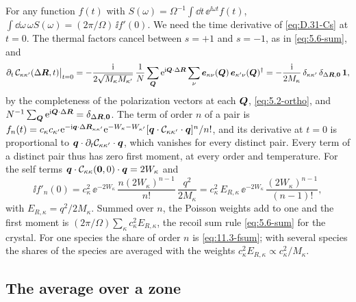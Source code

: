 For any function $f(t)$ with $S(\omega) = \Omega^{-1}\int\dd t\,\ee^{\ii\omega t}f(t)$, $\int\dd\omega\,\omega S(\omega) = (2\pi/\Omega)\,\ii f'(0)$. We need the time derivative of \cref{eq:D.31-Cs} at $t = 0$. The thermal factors cancel between $s = +1$ and $s = -1$, as in \cref{eq:5.6-sum}, and
\begin{equation*}
  \partial_t\,\mathcal{C}_{\kappa\kappa'}(\Delta\bm{R},t)\big|_{t=0} = -\frac{\mathrm{i}}{2\sqrt{M_\kappa M_{\kappa'}}}\,\frac1N\sum_{\bm{Q}}\mathrm{e}^{\mathrm{i}\bm{Q}\cdot\Delta\bm{R}}\sum_\nu\bm{e}_{\kappa\nu}(\bm{Q})\,\bm{e}_{\kappa'\nu}(\bm{Q})^\dagger = -\frac{\mathrm{i}}{2M_\kappa}\,\delta_{\kappa\kappa'}\,\delta_{\Delta\bm{R},\bm{0}}\,\mathbf{1} ,
\end{equation*}
by the completeness of the polarization vectors at each $\bm{Q}$, \cref{eq:5.2-ortho}, and $N^{-1}\sum_{\bm{Q}}\mathrm{e}^{\mathrm{i}\bm{Q}\cdot\Delta\bm{R}} = \delta_{\Delta\bm{R},\bm{0}}$. The term of order $n$ of a pair is $f_n(t) = c_\kappa c_{\kappa'}\mathrm{e}^{-\mathrm{i}\bm{q}\cdot\Delta\bm{R}_{\kappa\kappa'}}\mathrm{e}^{-W_\kappa - W_{\kappa'}}[\bm{q}\cdot\mathcal{C}_{\kappa\kappa'}\cdot\bm{q}]^n/n!$, and its derivative at $t = 0$ is proportional to $\bm{q}\cdot\partial_t\mathcal{C}_{\kappa\kappa'}\cdot\bm{q}$, which vanishes for every distinct pair. Every term of a distinct pair thus has zero first moment, at every order and temperature. For the self terms $\bm{q}\cdot\mathcal{C}_{\kappa\kappa}(\bm{0},0)\cdot\bm{q} = 2W_\kappa$ and
\begin{equation*}
  \ii f'_n(0) = c_\kappa^2\,\ee^{-2W_\kappa}\,\frac{n(2W_\kappa)^{n-1}}{n!}\,\frac{q^2}{2M_\kappa} = c_\kappa^2\,E_{R,\kappa}\,\ee^{-2W_\kappa}\,\frac{(2W_\kappa)^{n-1}}{(n-1)!} ,
\end{equation*}
with $E_{R,\kappa} = q^2/2M_\kappa$. Summed over $n$, the Poisson weights add to one and the first moment is $(2\pi/\Omega)\sum_\kappa c_\kappa^2E_{R,\kappa}$, the recoil sum rule \cref{eq:5.6-sum} for the crystal. For one species the share of order $n$ is \cref{eq:11.3-fsum}; with several species the shares of the species are averaged with the weights $c_\kappa^2E_{R,\kappa} \propto c_\kappa^2/M_\kappa$.

\subsection{The average over a zone}

